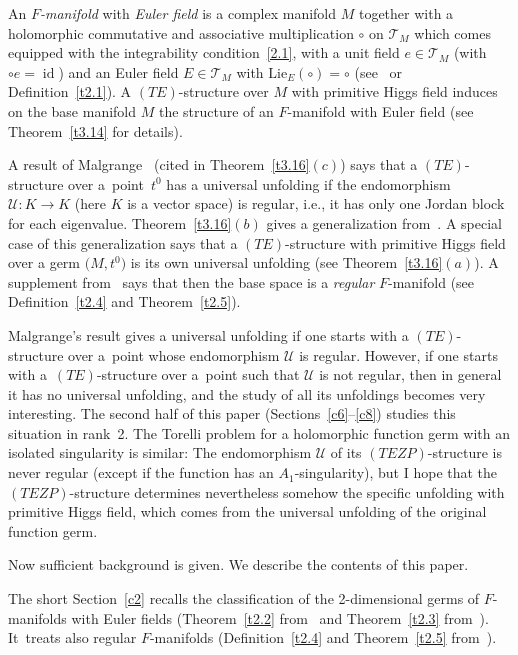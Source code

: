 \documentclass[10pt,a4paper]{amsart}
\numberwithin{equation}{section}
\numberwithin{figure}{section}
\newcommand{\TT}{{\mathcal T}}
\newcommand{\UU}{{\mathcal U}}
\DeclareMathOperator{\id}{id}
\begin{document}
An {\it $F$-manifold} with {\it Euler field}
is a complex manifold $M$
together with a holomorphic commutative and associative
multiplication $\circ$ on $\TT_M$ which comes equipped
with the integrability condition~\eqref{2.1},
with a unit field $e\in\TT_M$ (with $\circ e=\id$)
and an Euler field $E\in\TT_M$
with $\text{Lie}_E(\circ)=\circ$
(see~\cite{HM99} or Definition~\ref{t2.1}).
A $(TE)$-structure over $M$ with
primitive Higgs field indu\-ces on the base manifold $M$ the
structure of an $F$-manifold with Euler field
(see Theorem~\ref{t3.14} for details).

A result of Malgrange~\cite{Ma86} (cited in
Theorem~\ref{t3.16}$(c)$) says that a $(TE)$-structure
over a~point~$t^0$ has a universal unfolding if the
endomorphism $\UU\colon K\to K$ (here $K$ is a vector space)
is regular, i.e., it has only one Jordan block for each
eigenvalue. Theorem~\ref{t3.16}$(b)$ gives a generalization
from~\cite{HM04}. A special case of this generalization
says that a $(TE)$-structure with primitive
Higgs field over a germ $\big(M,t^0\big)$ is its own universal
unfolding (see Theorem~\ref{t3.16}$(a)$).
A supplement from~\cite{DH17} says that then the base space
is a {\it regular} $F$-manifold (see Definition~\ref{t2.4}
and Theorem~\ref{t2.5}).

Malgrange's result gives a universal unfolding
if one starts with a $(TE)$-structure over a~point
whose endomorphism $\UU$ is regular.
However, if one starts with a~$(TE)$-structure over a~point such that $\UU$ is not regular, then in general it
has no universal unfolding, and the study of all its
unfoldings becomes very interesting. The second half of
this paper (Sections~\ref{c6}--\ref{c8}) studies
this situation in rank~2. The Torelli problem for a
holomorphic function germ with an isolated singularity
is similar: The endomorphism
$\UU$ of its $(TEZP)$-structure is never regular
(except if the function has an $A_1$-singularity),
but I hope that the $(TEZP)$-structure
determines nevertheless somehow the specific
unfolding with primitive Higgs field, which comes from the
universal unfolding of the original function germ.

Now sufficient background is given.
We describe the contents of this paper.

The short Section~\ref{c2} recalls the classification of the
2-dimensional germs of $F$-manifolds with Euler fields
(Theorem~\ref{t2.2} from~\cite{He02} and Theorem~\ref{t2.3}
from~\cite{DH20-3}). It~treats also regular $F$-manifolds
(Definition~\ref{t2.4} and Theorem~\ref{t2.5} from~\cite{DH17}).
\end{document}
